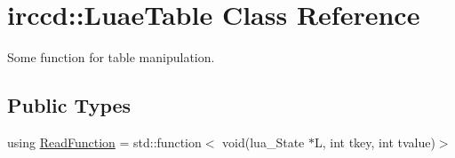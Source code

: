 \hypertarget{a00044}{\section{irccd\-:\-:Luae\-Table Class Reference}
\label{a00044}
}


Some function for table manipulation.  


\subsection*{Public Types}
\begin{DoxyCompactItemize}
\item 
using \hyperlink{a00044_a9cf9541d4e6a0c0e659582029b5e015a}{Read\-Function} = std\-::function$<$ void(lua\-\_\-\-State $\ast$L, int tkey, int tvalue)$>$
\end{DoxyCompactItemize}

